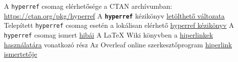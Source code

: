 \documentclass{article}
\begin{document}
\begin{thebibliography}{xx}
A \verb!hyperref! csomag elérhetősége a CTAN archívumban:
\url{https://ctan.org/pkg/hyperref}
A {\bfseries \verb!hyperref!} kézikönyv  \href{https://mirror.szerverem.hu/ctan/macros/latex/contrib/hyperref/doc/hyperref-doc.pdf}{letölthető változata}
Telepített  \verb!hyperref! csomag esetén a lokálisan elérhető
\href{run:/usr/share/texlive/texmf-dist/doc/latex/hyperref/hyperref-doc.pdf}{hyperref kézikönyv}
A \verb!hyperref! csomag ismert \href{https://github.com/latex3/hyperref/issues}{hibái}
A \LaTeX{} Wiki könyvben a \href{https://en.wikibooks.org/wiki/LaTeX/Hyperlinks}{hiperlinkek használatára} vonatkozó rész
Az Overleaf online szerkesztőprogram
\href{https://www.overleaf.com/learn/latex/Hyperlinks}{hiperlink ismertetője}
\end{thebibliography}
\end{document}
